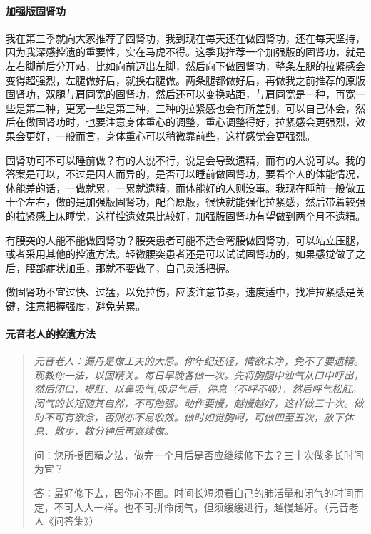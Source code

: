 \paragraph{加强版固肾功}

我在第三季就向大家推荐了固肾功，我到现在每天还在做固肾功，还在每天坚持，因为我深感控遗的重要性，实在马虎不得。这季我推荐一个加强版的固肾功，就是左右脚前后分开站，比如向前迈出左脚，然后向下做固肾功，整条左腿的拉紧感会变得超强烈，左腿做好后，就换右腿做。两条腿都做好后，再做我之前推荐的原版固肾功，双腿与肩同宽的固肾功，然后还可以变换站距，与肩同宽是一种，再宽一些是第二种，更宽一些是第三种，三种的拉紧感也会有所差别，可以自己体会，然后在做固肾功时，也要注意身体重心的调整，重心调整得好，拉紧感会更强烈，效果会更好，一般而言，身体重心可以稍微靠前些，这样感觉会更强烈。

固肾功可不可以睡前做？有的人说不行，说是会导致遗精，而有的人说可以。我的答案是可以，不过是因人而异的，是否可以睡前做固肾功，要看个人的体能情况，体能差的话，一做就累，一累就遗精，而体能好的人则没事。我现在睡前一般做五十个左右，做的是加强版固肾功，配合原版，很快就能强化拉紧感，然后带着较强的拉紧感上床睡觉，这样控遗效果比较好，加强版固肾功有望做到两个月不遗精。

有腰突的人能不能做固肾功？腰突患者可能不适合弯腰做固肾功，可以站立压腿，或者采用其他的控遗方法。轻微腰突患者还是可以试试固肾功的，如果感觉做了之后，腰部症状加重，那就不要做了，自己灵活把握。

做固肾功不宜过快、过猛，以免拉伤，应该注意节奏，速度适中，找准拉紧感是关键，注意把握强度，避免劳累。

\paragraph{元音老人的控遗方法}

\begin{quotation}\it
    元音老人：漏丹是做工夫的大忌。你年纪还轻，情欲未净，免不了要遗精。现教你一法，以固精关。每日早晚各做一次。先将胸腹中浊气从口中呼出，然后闭口，提肛、以鼻吸气,吸足气后，停息（不呼不吸），然后呼气松肛。闭气的长短随其自然，不可勉强。动作要慢，越慢越好，这样做三十次。做时不可有欲念，否则亦不易收效。做时如觉胸闷，可做四至五次，放下休息、散步，数分钟后再继续做。

    问：您所授固精之法，做完一个月后是否应继续修下去？三十次做多长时间为宜？

    答：最好修下去，因你心不固。时间长短须看自己的肺活量和闭气的时间而定，不可人人一样。也不可拼命闭气，但须缓缓进行，越慢越好。（元音老人《问答集》）
\end{quotation}

